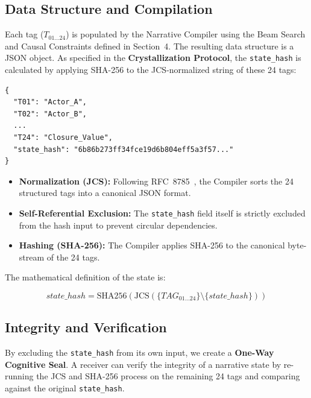 \documentclass[11pt,a4paper]{article}
\begin{document}
\subsection{Data Structure and Compilation}

Each tag ($T_{01 \dots 24}$) is populated by the Narrative Compiler
using the Beam Search and Causal Constraints defined in Section~4. The
resulting data structure is a JSON object. As specified in the
\textbf{Crystallization Protocol}, the \texttt{state\_hash} is
calculated by applying SHA-256 to the JCS-normalized string of these 24
tags:

\begin{lstlisting}[style=json]
{
  "T01": "Actor_A",
  "T02": "Actor_B",
  ...
  "T24": "Closure_Value",
  "state_hash": "6b86b273ff34fce19d6b804eff5a3f57..."
}
\end{lstlisting}

\begin{itemize}[noitemsep]
  \item \textbf{Normalization (JCS):} Following RFC~8785~\cite{rfc8785}, the Compiler sorts the 24 structured tags into a canonical JSON format.
  \item \textbf{Self-Referential Exclusion:} The \texttt{state\_hash} field itself is strictly excluded from the hash input to prevent circular dependencies.
  \item \textbf{Hashing (SHA-256):} The Compiler applies SHA-256 to the canonical byte-stream of the 24 tags.
\end{itemize}

The mathematical definition of the state is:

\begin{equation}
  state\_hash = \mathrm{SHA256}\!\left(\mathrm{JCS}\!\left(\{TAG_{01 \dots 24}\} \setminus \{state\_hash\}\right)\right)
\end{equation}

\subsection{Integrity and Verification}

By excluding the \texttt{state\_hash} from its own input, we create a
\textbf{One-Way Cognitive Seal}. A receiver can verify the integrity of
a narrative state by re-running the JCS and SHA-256 process on the
remaining 24 tags and comparing against the original \texttt{state\_hash}.

\end{document}
